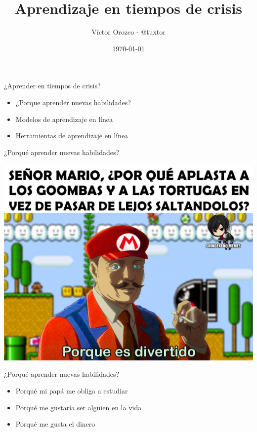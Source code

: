 \documentclass[aspectratio=169]{beamer}
\title{Aprendizaje en tiempos de crisis}
\author{Víctor Orozco - @tuxtor}
\institute{Academik}
\date{\today}
\begin{document}
{
    \frame{\titlepage}
}

\begin{frame}[fragile]{¿Aprender en tiempos de crisis?}
	\begin{itemize}
		\item ¿Porque aprender nuevas habilidades?
		\item Modelos de aprendizaje en línea
		\item Herramientas de aprendizaje en línea
	\end{itemize}	
\end{frame}

\begin{frame}[fragile]{¿Porqué aprender nuevas habilidades?}
    \begin{center}
        \includegraphics[width=0.6\linewidth]{Images/divertido}
    \end{center}	
\end{frame}

\begin{frame}[fragile]{¿Porqué aprender nuevas habilidades?}
    \begin{itemize}
        \item Porqué mi papá me obliga a estudiar
        \item Porqué me gustaría ser alguien en la vida
        \item Porqué me gusta el dinero
    \end{itemize}	
\end{frame}
\end{document}
